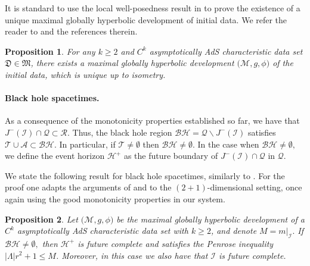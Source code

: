 \documentclass[11pt]{article}
\newtheorem{proposition}{Proposition}[section]
\numberwithin{equation}{section}
\begin{document}
It is standard to use the local well-posedness result in  to prove the existence of a unique maximal globally hyperbolic development of initial data. We refer the reader to \cite[Section 4]{localwellposed} and the references therein.
\begin{proposition}
    For any $k\geq2$ and $C^{k}$ asymptotically AdS characteristic data set $\mathfrak{D}\in\mathfrak{M}$, there exists a maximal globally hyperbolic development $\big(\mathcal{M},g,\phi\big)$ of the initial data, which is unique up to isometry.
\end{proposition}


\paragraph{Black hole spacetimes.} As a consequence of the monotonicity properties established so far, we have that $J^-(\mathcal{I})\cap\mathcal{Q}\subset\mathcal{R}.$ Thus, the black hole region $\mathcal{BH}=\mathcal{Q}\backslash J^-(\mathcal{I})$ satisfies $\mathcal{T}\cup\mathcal{A}\subset\mathcal{BH}.$ In particular, if $\mathcal{T}\neq\emptyset$ then $\mathcal{BH}\neq\emptyset.$ In the case when $\mathcal{BH}\neq\emptyset,$ we define the event horizon $\mathcal{H}^+$ as the future boundary of $J^-(\mathcal{I})\cap\mathcal{Q}$ in $\mathcal{Q}.$

We state the following result for black hole spacetimes, similarly to \cite{Dafermos_trapped}. For the proof one adapts the arguments of \cite[Section 5]{price} and \cite[Section 8.2]{localwellposed} to the $(2+1)$-dimensional setting, once again using the good monotonicity properties in our system. 

\begin{proposition}\label{Penrose ineq and completeness proposition}
    Let $\big(\mathcal{M},g,\phi\big)$ be the maximal globally hyperbolic development of a $C^{k}$ asymptotically AdS characteristic data set with $k\geq2$, and denote $M=m|_{\mathcal{I}}.$ If $\mathcal{BH}\neq\emptyset,$ then $\mathcal{H}^+$ is future complete and satisfies the Penrose inequality $|\Lambda|r^2+1\leq M$. Moreover, in this case we also have that $\mathcal{I}$ is future complete.
\end{proposition}
\end{document}
